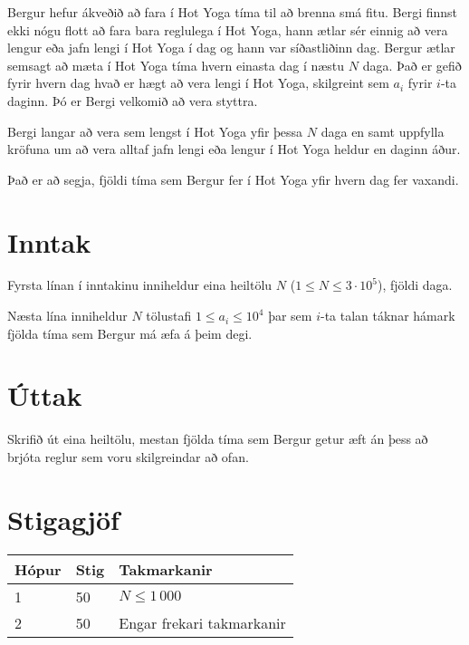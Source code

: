 
Bergur hefur ákveðið að fara í Hot Yoga tíma til að brenna smá fitu. Bergi
finnst ekki nógu flott að fara bara reglulega í Hot Yoga, hann ætlar sér einnig
að vera lengur eða jafn lengi í Hot Yoga í dag og hann var síðastliðinn dag.
Bergur ætlar semsagt að mæta í Hot Yoga tíma hvern einasta dag í næstu $N$ daga.
Það er gefið fyrir hvern dag hvað er hægt að vera lengi í Hot Yoga, skilgreint sem $a_i$ fyrir
$i$-ta daginn. Þó er Bergi velkomið að vera styttra.

Bergi langar að vera sem lengst í Hot Yoga yfir þessa $N$ daga en samt uppfylla
kröfuna um að vera alltaf jafn lengi eða lengur í Hot Yoga heldur en daginn áður.

Það er að segja, fjöldi tíma sem Bergur fer í Hot Yoga yfir hvern dag fer vaxandi.

\section*{Inntak}
Fyrsta línan í inntakinu inniheldur eina heiltölu $N$ ($1 \leq N \leq 3 \cdot 10^5$), fjöldi daga.

Næsta lína inniheldur $N$ tölustafi $1 \leq a_i \leq 10^4$ þar sem $i$-ta talan táknar hámark
fjölda tíma sem Bergur má æfa á þeim degi.

\section*{Úttak}
Skrifið út eina heiltölu, mestan fjölda tíma sem Bergur getur æft án þess að brjóta
reglur sem voru skilgreindar að ofan.

\section*{Stigagjöf}
\begin{tabular}{|l|l|l|}
\hline
Hópur & Stig & Takmarkanir \\ \hline
1     & 50   & $N \leq 1\,000$ \\ \hline
2     & 50   & Engar frekari takmarkanir \\ \hline
\end{tabular}

